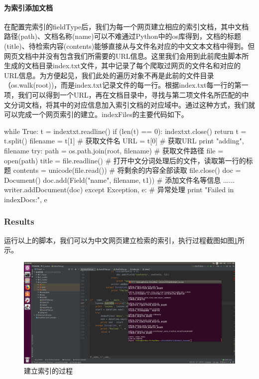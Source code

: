 \documentclass{article}
\begin{document}
\paragraph{为索引添加文档}
在配置完索引的fieldType后，我们为每一个网页建立相应的索引文档，其中文档路径(path)、文档名称(name)可以不难通过Python中的os库得到，文档的标题(title)、待检索内容(contents)能够直接从与文件名对应的中文文本文档中得到。但网页文档中并没有包含我们所需要的URL信息。这里我们会用到此前爬虫脚本所生成的文档目录index.txt文件，其中记录了每个爬取过网页的文件名和对应的URL信息。为方便起见，我们此处的遍历对象不再是此前的文件目录（os.walk(root))，而是index.txt记录文件的每一行。根据index.txt每一行的第一项，我们可以得到一个URL，再在文档目录中，寻找与第二项文件名所匹配的中文分词文档，将其中的对应信息加入索引文档的对应域中。通过这种方式，我们就可以完成一个网页索引的建立。indexFiles的主要代码如下。

\begin{python}
while True:
    t = indextxt.readline()
    if (len(t) == 0):
        indextxt.close()
        return
    t = t.split()
    filename = t[1]                           # 获取文件名
    URL = t[0]                                # 获取URL
    print "adding", filename
    try:
        path = os.path.join(root, filename)   # 获取文件路径
        file = open(path)
        title = file.readline()               # 打开中文分词处理后的文件，读取第一行的标题
        contents = unicode(file.read())       # 将剩余的内容全部读取
        file.close()
        doc = Document()
        doc.add(Field("name", filename, t1))  # 添加文件名等信息
        ......
        writer.addDocument(doc)
    except Exception, e:                      # 异常处理
        print "Failed in indexDocs:", e
\end{python}


\subsubsection{Results}
运行以上的脚本，我们可以为中文网页建立检索的索引，执行过程截图如图\ref{fig:indextext}所示。


\begin{figure}[hbp]
\centering
\includegraphics[width=14.5cm]{img/indextext.png}
\caption{建立索引的过程}
\label{fig:indextext}
\end{figure}
\end{document}
